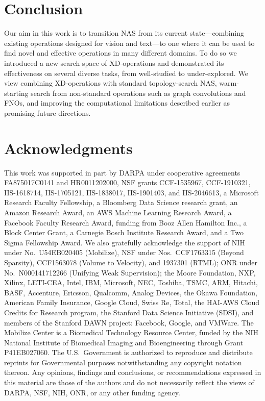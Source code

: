 
\section{Conclusion}

Our aim in this work is to transition NAS from its current state---combining existing operations designed for vision and text---to one where it can be used to find novel and effective operations in many different domains.
To do so we introduced a new search space of XD-operations and demonstrated its effectiveness on several diverse tasks, from well-studied to under-explored.
We view combining XD-operations with standard topology-search NAS, warm-starting search from non-standard operations such as graph convolutions and FNOs, and improving the computational limitations described earlier as promising future directions.

\section*{Acknowledgments}

This work was supported in part by DARPA under cooperative agreements FA875017C0141 and HR0011202000, NSF grants CCF-1535967, CCF-1910321, IIS-1618714, IIS-1705121, IIS-1838017, IIS-1901403, and IIS-2046613, a Microsoft Research Faculty Fellowship, a Bloomberg Data Science research grant, an Amazon Research Award, an AWS Machine Learning Research Award, a Facebook Faculty Research Award, funding from Booz Allen Hamilton Inc., a Block Center Grant, a Carnegie Bosch Institute Research Award, and a Two Sigma Fellowship Award.
We also gratefully acknowledge the support of NIH under No.\ U54EB020405 (Mobilize), NSF under Nos.\ CCF1763315 (Beyond Sparsity), CCF1563078 (Volume to Velocity), and 1937301 (RTML); ONR under No.\ N000141712266 (Unifying Weak Supervision); the Moore Foundation, NXP, Xilinx, LETI-CEA, Intel, IBM, Microsoft, NEC, Toshiba, TSMC, ARM, Hitachi, BASF, Accenture, Ericsson, Qualcomm, Analog Devices, the Okawa Foundation, American Family Insurance, Google Cloud, Swiss Re, Total, the HAI-AWS Cloud Credits for Research program, the Stanford Data Science Initiative (SDSI), and members of the Stanford DAWN project: Facebook, Google, and VMWare.
The Mobilize Center is a Biomedical Technology Resource Center, funded by the NIH National Institute of Biomedical Imaging and Bioengineering through Grant P41EB027060.
The U.S.\ Government is authorized to reproduce and distribute reprints for Governmental purposes notwithstanding any copyright notation thereon.
Any opinions, findings and conclusions, or recommendations expressed in this material are those of the authors and do not necessarily reflect the views of DARPA, NSF, NIH, ONR, or any other funding agency.